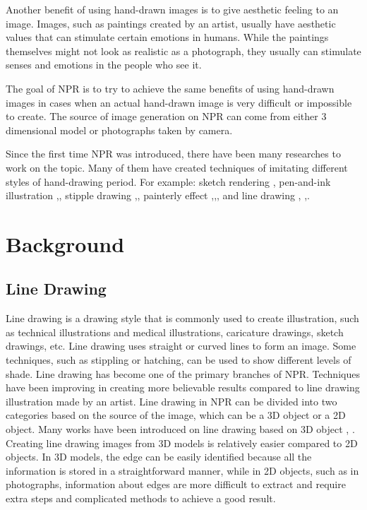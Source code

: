 Another benefit of using hand-drawn images is to give aesthetic feeling to an image. Images, such as paintings created by an artist, usually have aesthetic values that can stimulate certain emotions in humans. While the paintings themselves might not look as realistic as a photograph, they usually can stimulate senses and emotions in the people who see it.

The goal of NPR is to try to achieve the same benefits of using hand-drawn images in cases when an actual hand-drawn image is very difficult or impossible to create. The source of image generation on NPR can come from either 3 dimensional model or photographs taken by camera.

Since the first time NPR was introduced, there have been many researches to work on the topic. Many of them have created techniques of imitating different styles of hand-drawing period. For example: sketch rendering \cite{strothotte94}, pen-and-ink illustration \cite{winkenbach94},\cite{salisbury94}, stipple drawing \cite{secord02},\cite{deussen00}, painterly effect \cite{litwinowicz97},\cite{hertzmann98},\cite{hays04}, and line drawing \cite{decarlo03}, \cite{sousa03},\cite{kang07}.

\chapter{Background}

\section{Line Drawing} 
Line drawing is a drawing style that is commonly used to create illustration, such as technical illustrations and medical illustrations, caricature drawings, sketch drawings, etc. Line drawing uses straight or curved lines to form an image. Some techniques, such as stippling or hatching, can be used to show different levels of shade. Line drawing has become one of the primary branches of NPR. Techniques have been improving in creating more believable results compared to line drawing illustration made by an artist. Line drawing in NPR can be divided into two categories based on the source of the image, which can be a 3D object or a 2D object. Many works have been introduced on line drawing based on 3D object \cite{decarlo03}, \cite{sousa03}. Creating line drawing images from 3D models is relatively easier compared to 2D objects. In 3D models, the edge can be easily identified because all the information is stored in a straightforward manner, while in 2D objects, such as in photographs, information about edges are more difficult to extract and require extra steps and complicated methods to achieve a good result.

